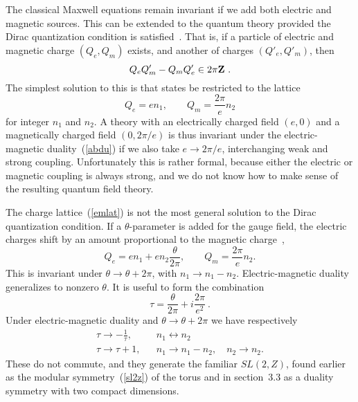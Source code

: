 The classical Maxwell equations remain invariant if we add both
electric and magnetic sources.  This can be extended to the quantum
theory provided the Dirac quantization condition is
satisfied~\cite{Dirac}. That is, if a particle of electric and
magnetic charge $(Q_e, Q_m)$ exists, and another of charges $(Q'_e,
Q'_m)$, then
\begin{equation}
Q_e Q'_m - Q_m Q'_e \in 2\pi {\bf Z}\ .
\end{equation}
The simplest solution to this is that states be restricted to the
lattice
\begin{equation}
Q_e = e n_1, \qquad Q_m = \frac{2\pi}{e} n_2 \label{emlat}
\end{equation}
for integer $n_1$ and $n_2$.  A theory with an electrically charged
field $(e,0)$ and a magnetically charged field $(0,2\pi/e)$ is thus
invariant under the electric-magnetic duality~(\ref{abdu}) if we also
take $e \to 2\pi/e$, interchanging weak and strong coupling.
Unfortunately this is rather formal, because either the electric
or magnetic coupling is always strong, and we do not know how to make
sense of the resulting quantum field theory.

The charge lattice~(\ref{emlat}) is not the most general solution to
the Dirac quantization condition.  If a
$\theta$-parameter is added for the gauge field, the electric charges
shift by an amount proportional to the magnetic
charge~\cite{Wtheta},
\begin{equation}
Q_e = e n_1 + e n_2 \frac{\theta}{2\pi} , \qquad Q_m = \frac{2\pi}{e}
n_2.
\label{witlat}
\end{equation}
This is invariant under $\theta \to \theta+2\pi$, with $n_1 \to n_1 -
n_2$.  Electric-magnetic duality generalizes to nonzero $\theta$.  
It is useful to form the combination
\begin{equation}
\tau = \frac{\theta}{2\pi} + i \frac{2\pi}{e^2}\ .
\end{equation}
Under electric-magnetic duality and $\theta \to \theta+2\pi$ we have
respectively
\begin{eqnarray}
\tau \to -\frac{1}{\tau}, && n_1 \leftrightarrow n_2 \nonumber\\
\tau \to \tau + 1, && n_1 \to n_1 - n_2, \quad n_2 \to n_2. 
\label{sl2zem}
\end{eqnarray}
These do not commute, and they generate the familiar $SL(2,Z)$, found
earlier as the modular symmetry~(\ref{sl2z}) of the torus and in
section~3.3 as a duality symmetry with two compact
dimensions.

